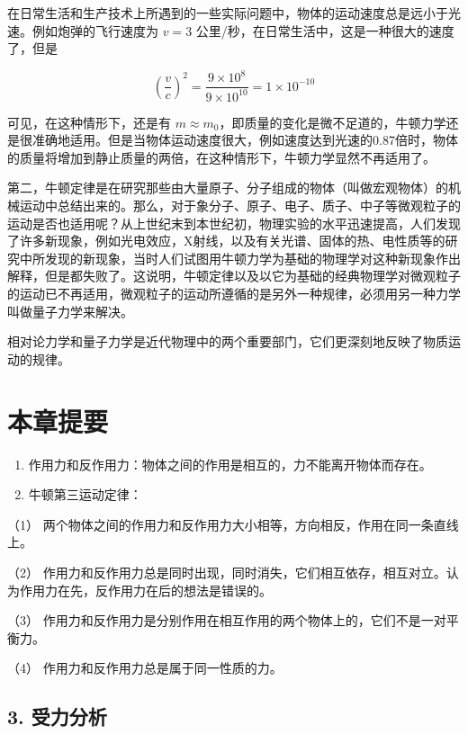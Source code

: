 在日常生活和生产技术上所遇到的一些实际问题中，物体的运动速度总是远小于光速。例如炮弹的飞行速度为
\(v = 3\) 公里/秒，在日常生活中，这是一种很大的速度了，但是

\[
\left(\frac {v}{c}\right) ^ {2} = \frac {9 \times 10 ^ {8}}{9 \times 10 ^ {10}} = 1 \times 10 ^ {- 10}
\]

可见，在这种情形下，还是有
\(m \approx m_0\)，即质量的变化是微不足道的，牛顿力学还是很准确地适用。但是当物体运动速度很大，例如速度达到光速的0.87倍时，物体的质量将增加到静止质量的两倍，在这种情形下，牛顿力学显然不再适用了。

第二，牛顿定律是在研究那些由大量原子、分子组成的物体（叫做宏观物体）的机械运动中总结出来的。那么，对于象分子、原子、电子、质子、中子等微观粒子的运动是否也适用呢？从上世纪末到本世纪初，物理实验的水平迅速提高，人们发现了许多新现象，例如光电效应，X射线，以及有关光谱、固体的热、电性质等的研究中所发现的新现象，当时人们试图用牛顿力学为基础的物理学对这种新现象作出解释，但是都失败了。这说明，牛顿定律以及以它为基础的经典物理学对微观粒子的运动已不再适用，微观粒子的运动所遵循的是另外一种规律，必须用另一种力学叫做量子力学来解决。

相对论力学和量子力学是近代物理中的两个重要部门，它们更深刻地反映了物质运动的规律。

\section{本章提要}\label{ux672cux7ae0ux63d0ux8981-7}

\begin{enumerate}
\def\labelenumi{\arabic{enumi}.}
\item
  作用力和反作用力：物体之间的作用是相互的，力不能离开物体而存在。
\item
  牛顿第三运动定律：
\end{enumerate}

（1）
两个物体之间的作用力和反作用力大小相等，方向相反，作用在同一条直线上。

（2）
作用力和反作用力总是同时出现，同时消失，它们相互依存，相互对立。认为作用力在先，反作用力在后的想法是错误的。

（3）
作用力和反作用力是分别作用在相互作用的两个物体上的，它们不是一对平衡力。

（4） 作用力和反作用力总是属于同一性质的力。

\subsection{3. 受力分析}\label{ux53d7ux529bux5206ux6790}

